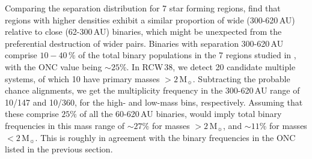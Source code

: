 \documentclass[a4paper,fleqn,usenatbib]{mnras}
\begin{document}
Comparing the separation distribution for 7 star forming regions, \citet{king12b} find that
regions with higher densities exhibit a similar proportion of wide (300-620\,AU) relative to close
(62-300\,AU) binaries, which might be unexpected from the preferential destruction of wider pairs.
Binaries with separation 300-620\,AU comprise $10 - 40\,\%$ of the total binary populations in the 7
regions studied in \citet{king12b}, with the ONC value being $\sim 25\%$.
In RCW\,38, we detect 20 candidate multiple systems, of which 10 have primary masses $>2$\,M$_{\sun}$. Subtracting the 
probable chance alignments, we get the multiplicity frequency in the 300-620\,AU range of 10/147 and 10/360, for the high-
and low-mass bins, respectively. Assuming that these comprise $25\%$ of all the 60-620\,AU binaries, would 
imply total binary frequencies in this mass range of $\sim 27\%$ for masses $>2$\,M$_{\sun}$, and $\sim 11\%$ for masses $<2$\,M$_{\sun}$.
This is roughly in agreement with the binary frequencies in the ONC listed in the previous section.    
\end{document}
